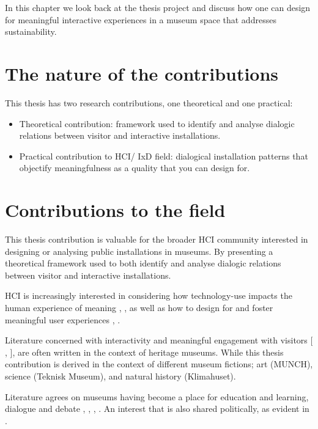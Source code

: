 In this chapter we look back at the thesis project and discuss how one can design for meaningful interactive experiences in a museum space that addresses sustainability.

\section{The nature of the contributions}
This thesis has two research contributions, one theoretical and one practical:
\begin{itemize}
    \item Theoretical contribution: framework used to identify and analyse dialogic relations between visitor and interactive installations.
    \item Practical contribution to HCI/ IxD field: dialogical installation patterns that objectify meaningfulness as a quality that you can design for.
\end{itemize}


\section{Contributions to the field}

This thesis contribution is valuable for the broader HCI community interested in designing or analysing public installations in museums. By presenting a theoretical framework used to both identify and analyse dialogic relations between visitor and interactive installations. 

HCI is increasingly interested in considering how technology-use impacts the human experience of meaning \autocite{kaptelinin_technology_2018}, \autocite{light_design_2017}, as well as how to design for and foster meaningful user experiences \autocite{grosse-hering_slow_2013}, \autocite{Hassenzahl_Moments_2013}.


Literature concerned with interactivity and meaningful engagement with visitors [ \autocite{mccarthy_place}, \autocite{ciolfi_designing_2012}], are often written in the context of heritage museums. While this thesis contribution is derived in the context of different museum fictions; art (MUNCH), science (Teknisk Museum), and natural history (Klimahuset). 


Literature agrees on museums having become a place for education and learning, dialogue and debate \autocite{narrative_sitzia}, \autocite{hein_1998}, \autocite{hooper_1994}, \autocite{Roberts_1997}. An interest that is also shared politically, as evident in \autocite{melding23}. 

